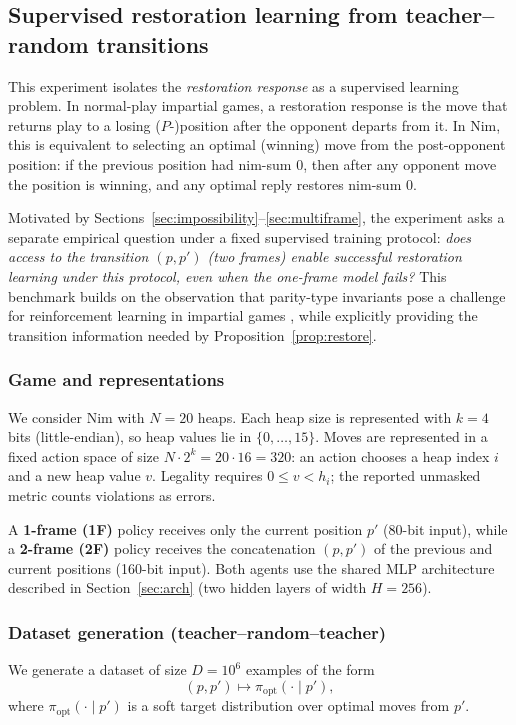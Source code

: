 \documentclass[11pt]{article}
\theoremstyle{plain}
\theoremstyle{definition}
\theoremstyle{remark}
\numberwithin{equation}{section}
\begin{document}
\subsection{Supervised restoration learning from teacher--random transitions}
\label{sec:supervised-restoration}
\label{sec:exp-restoration}

This experiment isolates the \emph{restoration response} as a supervised learning problem.
In normal-play impartial games, a restoration response is the move that returns play to a losing ($P$-)position after the opponent departs from it.
In Nim, this is equivalent to selecting an optimal (winning) move from the post-opponent position: if the previous position had nim-sum $0$, then after any opponent move the position is winning, and any optimal reply restores nim-sum $0$.

Motivated by Sections~\ref{sec:impossibility}--\ref{sec:multiframe}, the experiment asks a separate empirical question under a fixed supervised training protocol:
\emph{does access to the transition $(p,p')$ (two frames) enable successful restoration learning under this protocol, even when the one-frame model fails?}
This benchmark builds on the observation that parity-type invariants pose a challenge for reinforcement learning in impartial games \cite{zhou2022impartial,zhou2023parity}, while explicitly providing the transition information needed by Proposition~\ref{prop:restore}.

\subsubsection{Game and representations}
We consider Nim with $N=20$ heaps.
Each heap size is represented with $k=4$ bits (little-endian), so heap values lie in $\{0,\ldots,15\}$.
Moves are represented in a fixed action space of size $N\cdot 2^k = 20\cdot 16 = 320$:
an action chooses a heap index $i$ and a new heap value $v$. Legality requires $0\le v<h_i$; the reported unmasked metric counts violations as errors.

A \textbf{1-frame (1F)} policy receives only the current position $p'$ (80-bit input),
while a \textbf{2-frame (2F)} policy receives the concatenation $(p,p')$ of the previous and current positions (160-bit input).
Both agents use the shared MLP architecture described in Section~\ref{sec:arch} (two hidden layers of width $H=256$).

\subsubsection{Dataset generation (teacher--random--teacher)}
We generate a dataset of size $D=10^6$ examples of the form
\[
(p, p') \mapsto \pi_{\mathrm{opt}}(\cdot \mid p') ,
\]
where $\pi_{\mathrm{opt}}(\cdot \mid p')$ is a soft target distribution over optimal moves from $p'$.
\end{document}

